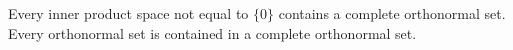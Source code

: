 Every inner product space not equal to $\{0\}$ contains a complete orthonormal set. Every orthonormal set is contained in a complete orthonormal set.
